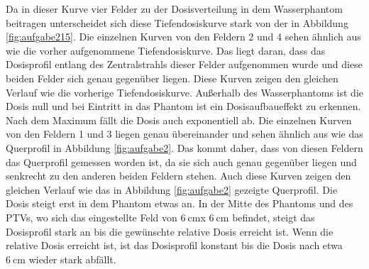 Da in dieser Kurve vier Felder zu der Dosisverteilung in dem Wasserphantom beitragen
unterscheidet sich diese Tiefendosiskurve stark von der in Abbildung \ref{fig:aufgabe215}.
Die einzelnen Kurven von den Feldern 2 und 4 sehen ähnlich aus wie die vorher
aufgenommene Tiefendosiskurve. Das liegt daran, dass das Dosisprofil entlang
des Zentralstrahls dieser Felder aufgenommen wurde und diese beiden Felder sich
genau gegenüber liegen. Diese Kurven zeigen den gleichen Verlauf wie die vorherige
Tiefendosiskurve. Außerhalb des Wasserphantoms ist die Dosis null und bei Eintritt
in das Phantom ist ein Dosisaufbaueffekt zu erkennen. Nach dem Maximum fällt die
Dosis auch exponentiell ab.
Die einzelnen Kurven von den Feldern 1 und 3 liegen genau
übereinander und sehen ähnlich aus wie das Querprofil in Abbildung \ref{fig:aufgabe2}.
Das kommt daher, dass von diesen Feldern das Querprofil gemessen worden ist, da sie
sich auch genau gegenüber liegen und senkrecht zu den anderen beiden Feldern stehen.
Auch diese Kurven zeigen den gleichen Verlauf wie das in Abbildung \ref{fig:aufgabe2}
gezeigte Querprofil. Die Dosis steigt erst in dem Phantom etwas an. In der Mitte
des Phantoms und des PTVs, wo sich das eingestellte Feld von $\SI{6}{\centi\meter}$x
$\SI{6}{\centi\meter}$ befindet, steigt das Dosisprofil stark an bis die gewünschte
relative Dosis erreicht ist. Wenn die relative Dosis erreicht ist, ist das
Dosisprofil konstant bis die Dosis nach etwa $\SI{6}{\centi\meter}$ wieder stark abfällt.

